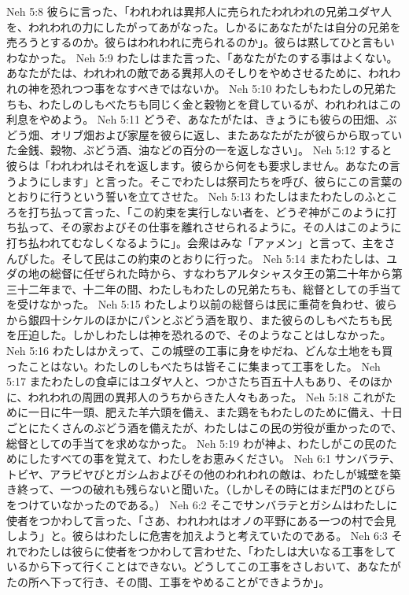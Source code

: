 Neh 5:8  彼らに言った、「われわれは異邦人に売られたわれわれの兄弟ユダヤ人を、われわれの力にしたがってあがなった。しかるにあなたがたは自分の兄弟を売ろうとするのか。彼らはわれわれに売られるのか」。彼らは黙してひと言もいわなかった。
Neh 5:9  わたしはまた言った、「あなたがたのする事はよくない。あなたがたは、われわれの敵である異邦人のそしりをやめさせるために、われわれの神を恐れつつ事をなすべきではないか。
Neh 5:10  わたしもわたしの兄弟たちも、わたしのしもべたちも同じく金と穀物とを貸しているが、われわれはこの利息をやめよう。
Neh 5:11  どうぞ、あなたがたは、きょうにも彼らの田畑、ぶどう畑、オリブ畑および家屋を彼らに返し、またあなたがたが彼らから取っていた金銭、穀物、ぶどう酒、油などの百分の一を返しなさい」。
Neh 5:12  すると彼らは「われわれはそれを返します。彼らから何をも要求しません。あなたの言うようにします」と言った。そこでわたしは祭司たちを呼び、彼らにこの言葉のとおりに行うという誓いを立てさせた。
Neh 5:13  わたしはまたわたしのふところを打ち払って言った、「この約束を実行しない者を、どうぞ神がこのように打ち払って、その家およびその仕事を離れさせられるように。その人はこのように打ち払われてむなしくなるように」。会衆はみな「アァメン」と言って、主をさんびした。そして民はこの約束のとおりに行った。
Neh 5:14  またわたしは、ユダの地の総督に任ぜられた時から、すなわちアルタシャスタ王の第二十年から第三十二年まで、十二年の間、わたしもわたしの兄弟たちも、総督としての手当てを受けなかった。
Neh 5:15  わたしより以前の総督らは民に重荷を負わせ、彼らから銀四十シケルのほかにパンとぶどう酒を取り、また彼らのしもべたちも民を圧迫した。しかしわたしは神を恐れるので、そのようなことはしなかった。
Neh 5:16  わたしはかえって、この城壁の工事に身をゆだね、どんな土地をも買ったことはない。わたしのしもべたちは皆そこに集まって工事をした。
Neh 5:17  またわたしの食卓にはユダヤ人と、つかさたち百五十人もあり、そのほかに、われわれの周囲の異邦人のうちからきた人々もあった。
Neh 5:18  これがために一日に牛一頭、肥えた羊六頭を備え、また鶏をもわたしのために備え、十日ごとにたくさんのぶどう酒を備えたが、わたしはこの民の労役が重かったので、総督としての手当てを求めなかった。
Neh 5:19  わが神よ、わたしがこの民のためにしたすべての事を覚えて、わたしをお恵みください。
Neh 6:1  サンバラテ、トビヤ、アラビヤびとガシムおよびその他のわれわれの敵は、わたしが城壁を築き終って、一つの破れも残らないと聞いた。（しかしその時にはまだ門のとびらをつけていなかったのである。）
Neh 6:2  そこでサンバラテとガシムはわたしに使者をつかわして言った、「さあ、われわれはオノの平野にある一つの村で会見しよう」と。彼らはわたしに危害を加えようと考えていたのである。
Neh 6:3  それでわたしは彼らに使者をつかわして言わせた、「わたしは大いなる工事をしているから下って行くことはできない。どうしてこの工事をさしおいて、あなたがたの所へ下って行き、その間、工事をやめることができようか」。
